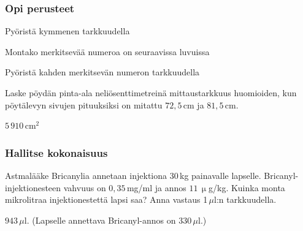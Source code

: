 \begin{tehtavasivu}
\subsubsection*{Opi perusteet}

\begin{tehtava}
Pyöristä kymmenen tarkkuudella
\begin{vastaus}
\end{vastaus}
\end{tehtava}

\begin{tehtava}
Montako merkitsevää numeroa on seuraavissa luvuissa
\begin{vastaus}
\end{vastaus}
\end{tehtava}

\begin{tehtava}
Pyöristä kahden merkitsevän numeron tarkkuudella
\begin{vastaus}
\end{vastaus}
\end{tehtava}

\begin{tehtava}
Laske pöydän pinta-ala neliösenttimetreinä mittaustarkkuus huomioiden, kun pöytälevyn sivujen pituuksiksi on mitattu $72,5$\,cm ja $81,5$\,cm.
\begin{vastaus}
$5\,910$\,cm$^2$
\end{vastaus}
\end{tehtava}

\subsubsection*{Hallitse kokonaisuus}

\begin{tehtava}
Astmalääke Bricanylia annetaan injektiona $30$\,kg painavalle lapselle. Bricanyl-injektionesteen vahvuus on $0,35$\,mg/ml ja annos $11$\,$\upmu$g/kg. Kuinka monta mikrolitraa injektionestettä lapsi saa? Anna vastaus 1\,$\mu$l:n tarkkuudella. %
 \begin{vastaus}
$943$\,$\mu$l. (Lapselle annettava Bricanyl-annos on $330$\,$\mu$l.) %
 \end{vastaus}
\end{tehtava}


\end{tehtavasivu}
